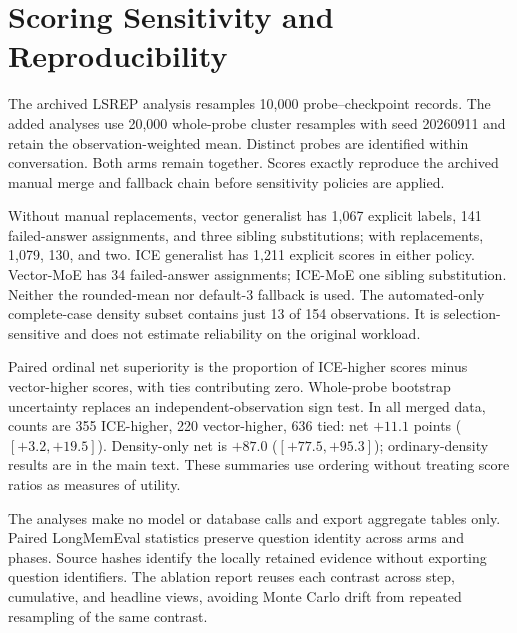 \documentclass[11pt]{article}
\begin{document}

\appendix
\section{Scoring Sensitivity and Reproducibility}
\label{app:sensitivity}
The archived LSREP analysis resamples 10,000 probe--checkpoint records. The added analyses use 20,000 whole-probe cluster resamples with seed 20260911 and retain the observation-weighted mean. Distinct probes are identified within conversation. Both arms remain together. Scores exactly reproduce the archived manual merge and fallback chain before sensitivity policies are applied.

\begin{table}[t]
\centering\small

\caption{Scoring-source and complete-case sensitivity, ICE v2 minus vector generalist. Cluster intervals condition on the same private histories.}
\end{table}

Without manual replacements, vector generalist has 1,067 explicit labels, 141 failed-answer assignments, and three sibling substitutions; with replacements, 1,079, 130, and two. ICE generalist has 1,211 explicit scores in either policy. Vector-MoE has 34 failed-answer assignments; ICE-MoE one sibling substitution. Neither the rounded-mean nor default-3 fallback is used. The automated-only complete-case density subset contains just 13 of 154 observations. It is selection-sensitive and does not estimate reliability on the original workload.

Paired ordinal net superiority is the proportion of ICE-higher scores minus vector-higher scores, with ties contributing zero. Whole-probe bootstrap uncertainty replaces an independent-observation sign test. In all merged data, counts are 355 ICE-higher, 220 vector-higher, 636 tied: net $+11.1$ points ($[+3.2,+19.5]$). Density-only net is $+87.0$ ($[+77.5,+95.3]$); ordinary-density results are in the main text. These summaries use ordering without treating score ratios as measures of utility.

The analyses make no model or database calls and export aggregate tables only. Paired LongMemEval statistics preserve question identity across arms and phases. Source hashes identify the locally retained evidence without exporting question identifiers. The ablation report reuses each contrast across step, cumulative, and headline views, avoiding Monte Carlo drift from repeated resampling of the same contrast.
\end{document}
